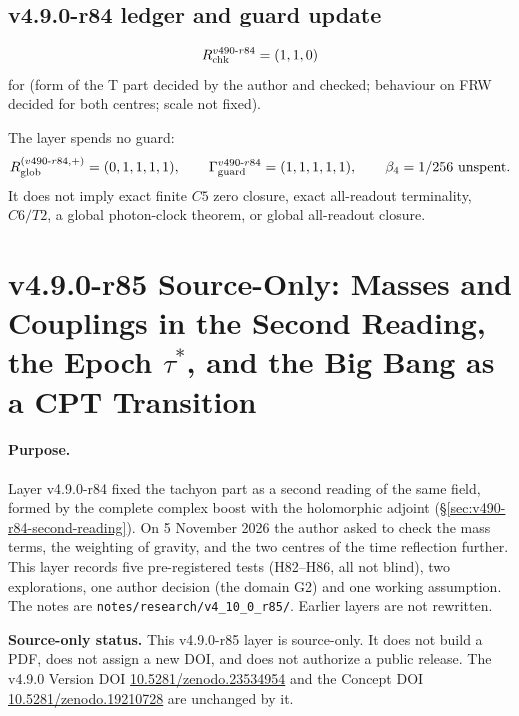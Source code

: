 \subsection*{v4.9.0-r84 ledger and guard update}
\label{subsec:v490-r84-ledger-guard}

\[
R_{\rm chk}^{v490\text{-}r84}=(1,1,0)
\]
for (form of the T part decided by the author and checked; behaviour on FRW decided for both centres; scale not fixed).

The layer spends no guard:
\[
R_{\rm glob}^{(v490\text{-}r84,+)}=(0,1,1,1,1),
\qquad
\Gamma_{\rm guard}^{v490\text{-}r84}=(1,1,1,1,1),
\qquad
\beta_4=1/256\ \text{unspent}.
\]
It does not imply exact finite \(C5\) zero closure, exact all-readout terminality,
\(C6/T2\), a global photon-clock theorem, or global all-readout closure.


\clearpage
\section*{v4.9.0-r85 Source-Only: Masses and Couplings in the Second Reading, the Epoch \texorpdfstring{\(\tau^*\)}{tau*}, and the Big Bang as a CPT Transition}
\label{sec:v490-r85-masses-cpt}

\paragraph{Purpose.}
Layer v4.9.0-r84 fixed the tachyon part as a second reading of the same field, formed by the complete complex boost with the
holomorphic adjoint (\S\ref{sec:v490-r84-second-reading}).  On 5 November 2026 the author asked to check the mass terms, the weighting
of gravity, and the two centres of the time reflection further.  This layer records five pre-registered tests (H82--H86, all not blind),
two explorations, one author decision (the domain G2) and one working assumption.  The notes are
\texttt{notes/\allowbreak research/\allowbreak v4\_10\_0\_r85/}.  Earlier layers are not rewritten.

\noindent\textbf{Source-only status.}
This v4.9.0-r85 layer is source-only.  It does not build a PDF, does not assign a new DOI,
and does not authorize a public release.  The v4.9.0 Version DOI
\href{https://doi.org/10.5281/zenodo.23534954}{10.5281/zenodo.23534954} and the Concept DOI
\href{https://doi.org/10.5281/zenodo.19210728}{10.5281/zenodo.19210728} are unchanged by it.

